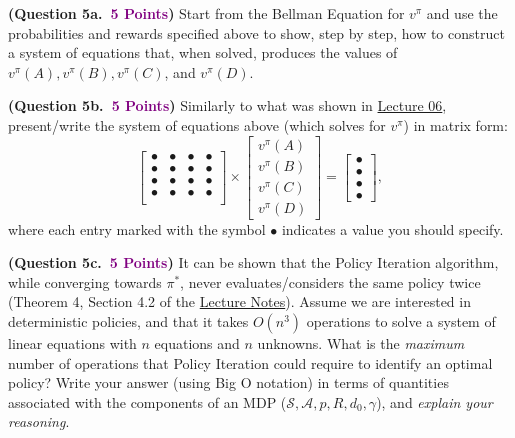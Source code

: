 \documentclass{article}
\newcommand{\POINTS}[1]{\textcolor{purple}{\textbf{{#1}}}}
\begin{document}
\begin{enumerate}
\textbf{(Question 5a.~\POINTS{5 Points})} Start from the Bellman Equation for $v^\pi$ and use the probabilities and rewards specified above to show, step by step, how to construct a system of equations that, when solved, produces the values of $v^\pi(A), v^\pi(B), v^\pi(C)$, and $v^\pi(D)$.


\vspace{0.5cm}
\textbf{(Question 5b.~\POINTS{5 Points})} Similarly to what was shown in \href{https://umass.moonami.com/pluginfile.php/2297824/mod_resource/content/4/06_CS687.pdf#page=55}{Lecture 06}, present/write the system of equations above (which solves for $v^\pi$) in matrix form:
%
\begin{equation}
\begin{bmatrix}
         \bullet & \bullet & \bullet & \bullet\\
         \bullet & \bullet & \bullet & \bullet\\
         \bullet & \bullet & \bullet & \bullet\\
         \bullet & \bullet & \bullet & \bullet\\
     \end{bmatrix}
     \times
     \begin{bmatrix}
         v^\pi(A) \\
         v^\pi(B) \\ 
         v^\pi(C) \\ 
         v^\pi(D)  
     \end{bmatrix}
      =
     \begin{bmatrix}
         \bullet \\
         \bullet \\ 
         \bullet \\ 
         \bullet  
     \end{bmatrix},
\end{equation}
where each entry marked with the symbol $\bullet$ indicates a value you should specify.



\vspace{0.5cm}
\textbf{(Question 5c.~\POINTS{5 Points})} It can be shown that the Policy Iteration algorithm, while converging towards $\pi^*$, never evaluates/considers the same policy twice (Theorem 4, Section 4.2 of the \href{https://people.cs.umass.edu/~bsilva/courses/CMPSCI_687/Fall2022/Lecture_Notes_v1.0_687_F22.pdf#page=45}{Lecture Notes}). Assume we are interested in deterministic policies, and that it takes $O(n^3)$ operations to solve a system of linear equations with $n$ equations and $n$ unknowns. What is the \textit{maximum} number of operations that Policy Iteration could require to identify an optimal policy? Write your answer (using Big O notation) in terms of quantities associated with the components of an MDP ($\mathcal S, \mathcal A, p, R, d_0, \gamma$), and \textit{explain your reasoning}.




\end{enumerate}
\end{document}
